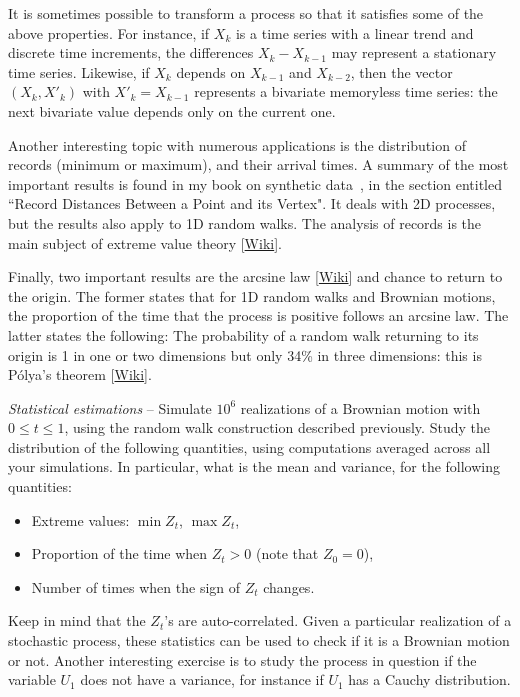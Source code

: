 \documentclass[oneside,10pt]{book}
\begin{document}
\noindent It is sometimes possible to transform a process so that it satisfies some of the above properties. For instance, if $X_k$ is a time series with a linear trend and discrete time increments, the differences $X_k - X_{k-1}$ may represent a stationary  time series. Likewise, if
$X_k$ depends on $X_{k-1}$ and $X_{k-2}$, then the vector $(X_k, X'_k)$ with $X'_k =
X_{k-1}$ represents a bivariate memoryless time series: the next bivariate value depends only on the current one.

Another interesting topic with numerous applications is the distribution of records (minimum or maximum), and their arrival times. A summary of the most important results  is found in my book on synthetic data~\cite{vgsynthetic}, in the section
entitled ``Record Distances Between a Point and its Vertex". It deals with 2D processes, but the results also apply to 1D random walks. The analysis of records is the main subject of \textcolor{index}{extreme value theory} [\href{https://en.wikipedia.org/wiki/Extreme_value_theory}{Wiki}].

Finally, two important results are the \textcolor{index}{arcsine law} [\href{https://en.wikipedia.org/wiki/Arcsine_laws_(Wiener_process)}{Wiki}] and chance to return to the origin. The former states that for 1D random walks and Brownian motions, the proportion of the time that the process is positive follows an arcsine law. The latter states the following: The probability of a random walk returning to its origin is 1 in one or two dimensions but only 34\% in three dimensions:
this is \textcolor{index}{Pólya's theorem} [\href{https://mathworld.wolfram.com/PolyasRandomWalkConstants.html}{Wiki}].

\begin{Exercise} {\em Statistical estimations} -- Simulate $10^6$ realizations of a Brownian motion with $0\leq t \leq 1$, using the random walk construction described previously. Study the distribution of the following quantities, using computations averaged across all your simulations. In particular, what is the mean and variance, for the following quantities:
\begin{itemize}
	\item Extreme values: $\min Z_t$, $\max Z_t$,
	\item Proportion of the time when $Z_t > 0$ (note that $Z_0 = 0$),
	\item Number of times when the sign of $Z_t$ changes.
\end{itemize}
Keep in mind that the $Z_t$'s are auto-correlated. Given a particular realization of a stochastic process, these statistics can be used to check if it is a Brownian motion or not. Another interesting exercise is to study the process in question if the variable $U_1$ does not have a variance, for instance if $U_1$ has a Cauchy distribution.
\end{Exercise}
\end{document}
